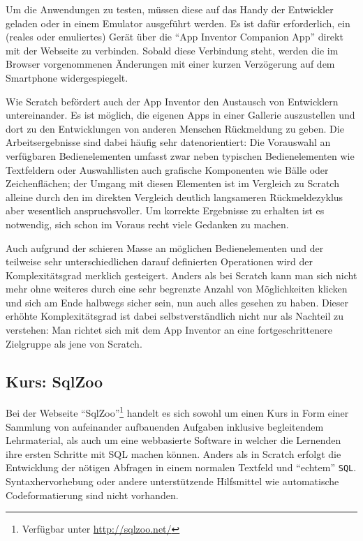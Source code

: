 Um die Anwendungen zu testen, müssen diese auf das Handy der Entwickler geladen oder in einem Emulator ausgeführt werden. Es ist dafür erforderlich, ein (reales oder emuliertes) Gerät über die "`App Inventor Companion App"' direkt mit der Webseite zu verbinden. Sobald diese Verbindung steht, werden die im Browser vorgenommenen Änderungen mit einer kurzen Verzögerung auf dem Smartphone widergespiegelt.

Wie Scratch befördert auch der App Inventor den Austausch von Entwicklern untereinander. Es ist möglich, die eigenen Apps in einer Gallerie auszustellen und dort zu den Entwicklungen von anderen Menschen Rückmeldung zu geben. Die Arbeitsergebnisse sind dabei häufig sehr datenorientiert: Die Vorauswahl an verfügbaren Bedienelementen umfasst zwar neben typischen Bedienelementen wie Textfeldern oder Auswahllisten auch grafische Komponenten wie Bälle oder Zeichenflächen; der Umgang mit diesen Elementen ist im Vergleich zu Scratch alleine durch den im direkten Vergleich deutlich langsameren Rückmeldezyklus aber wesentlich anspruchsvoller. Um korrekte Ergebnisse zu erhalten ist es notwendig, sich schon im Voraus recht viele Gedanken zu machen.

Auch aufgrund der schieren Masse an möglichen Bedienelementen und der teilweise sehr unterschiedlichen darauf definierten Operationen wird der Komplexitätsgrad merklich gesteigert. Anders als bei Scratch kann man sich nicht mehr ohne weiteres durch eine sehr begrenzte Anzahl von Möglichkeiten klicken und sich am Ende halbwegs sicher sein, nun auch alles gesehen zu haben. Dieser erhöhte Komplexitätsgrad ist dabei selbstverständlich nicht nur als Nachteil zu verstehen: Man richtet sich mit dem App Inventor an eine fortgeschrittenere Zielgruppe als jene von Scratch.

\subsection{Kurs: SqlZoo}

Bei der Webseite "`SqlZoo"'\footnote{Verfügbar unter \url{http://sqlzoo.net/}} handelt es sich sowohl um einen Kurs in Form einer Sammlung von aufeinander aufbauenden Aufgaben inklusive begleitendem Lehrmaterial, als auch um eine webbasierte Software in welcher die Lernenden ihre ersten Schritte mit SQL machen können. Anders als in Scratch erfolgt die Entwicklung der nötigen Abfragen in einem normalen Textfeld und "`echtem"' \texttt{SQL}. Syntaxhervorhebung oder andere unterstützende Hilfsmittel wie automatische Codeformatierung sind nicht vorhanden.

